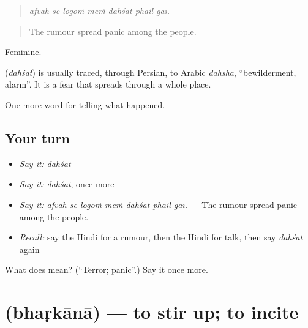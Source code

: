 \begin{quote}
      
\end{quote}

\begin{quote}
\emph{afvāh se logoṁ meṁ dahśat phail gaī.}
\end{quote}

\begin{quote}
The rumour spread panic among the people.
\end{quote}

Feminine.

\begin{cousinweb}
\textbf{} (\emph{dahśat}) is usually traced, through Persian, to Arabic \emph{dahsha}, \textquotedblleft{}bewilderment, alarm\textquotedblright{}. It is a fear that spreads through a whole place.
\end{cousinweb}

\begin{grammarlens}[title={What you've built}]
One more word for telling what happened.
\end{grammarlens}

\subsection*{Your turn}
\begin{itemize}
\raggedright
  \item \emph{Say it:} \emph{dahśat}
  \item \emph{Say it:} \emph{dahśat}, once more
  \item \emph{Say it:} \emph{afvāh se logoṁ meṁ dahśat phail gaī.} — The rumour spread panic among the people.
  \item \emph{Recall:} say the Hindi for a rumour, then the Hindi for talk, then say \emph{dahśat} again
\end{itemize}

\begin{tcolorbox}[breakable,colback=teal!4,colframe=teal!35!black,title={Before you move on}]
What does  mean? (\textquotedblleft{}Terror; panic\textquotedblright{}.) Say it once more.
\end{tcolorbox}
\section[\texorpdfstring{\hi{भड़काना} (bhaṛkānā)}{भड़काना (bhaṛkānā)}]{ (bhaṛkānā) — to stir up; to incite}

